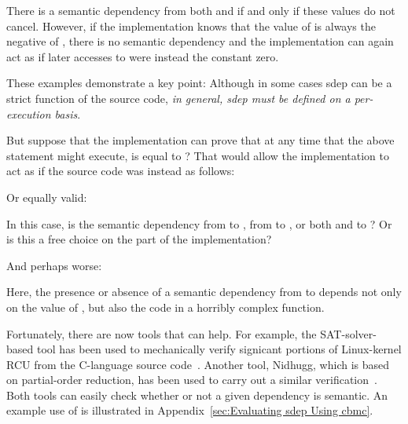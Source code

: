 \documentclass[10]{article}
\begin{document}
There is a semantic dependency from both  and  if and only
if these values do not cancel.
However, if the implementation knows that the value of  is always
the negative of , there is no semantic dependency and the
implementation can again act as if later accesses to  were
instead the constant zero.

These examples demonstrate a key point: Although in some cases sdep can
be a strict function of the source code, \emph{in general, sdep must be
defined on a per-execution basis}.

But suppose that the implementation can prove that at any time that
the above statement might execute,  is equal to ?
That would allow the implementation to act as if the source code
was instead as follows:

\begin{quote}
\end{quote}

Or equally valid:

\begin{quote}
\end{quote}

In this case, is the semantic dependency from  to ,
from  to , or both  and  to ?
Or is this a free choice on the part of the implementation?

And perhaps worse:

\begin{quote}
\end{quote}

Here, the presence or absence of a semantic dependency from  to
 depends not only on the value of , but also the code in
a horribly complex function.

Fortunately, there are now tools that can help.
For example, the SAT-solver-based  tool
has been used to mechanically verify signicant portions of Linux-kernel
RCU from the C-language source
code~\cite{LihaoLiang2016VerifyTreeRCU,LanceRoy2017CBMC-SRCU}.
Another tool, Nidhugg, which is based on partial-order
reduction, has been used to carry out a similar
verification~\cite{MichalisKokologiannakis2017NidhuggRCU,SMC-TreeRCU,MichalisKokologiannakis2019RCUstatelessModelCheck}.
Both tools can easily check whether or not a given dependency is semantic.
An example use of  is illustrated in
Appendix~\ref{sec:Evaluating sdep Using cbmc}.
\end{document}
